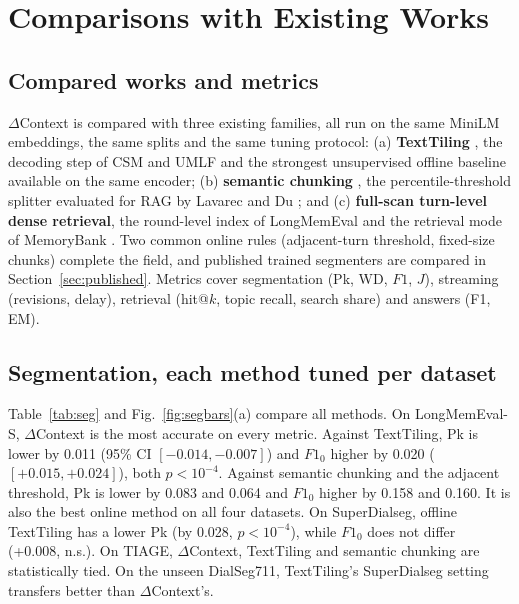 \documentclass[journal]{IEEEtran}
\newcommand{\dc}{$\Delta$Context}
\begin{document}
\section{Comparisons with Existing Works}
\label{sec:comp}

\subsection{Compared works and metrics}
\dc{} is compared with three existing families, all run on the same MiniLM
embeddings, the same splits and the same tuning protocol:
(a) \textbf{TextTiling} \cite{hearst1997texttiling}, the decoding step of CSM
and UMLF \cite{xing2021csm,xu2025umlf} and the strongest unsupervised offline
baseline available on the same encoder;
(b) \textbf{semantic chunking} \cite{langchain2024semantic}, the
percentile-threshold splitter evaluated for RAG by Lavarec and Du
\cite{lavarec2026chunking}; and (c) \textbf{full-scan turn-level dense
retrieval}, the round-level index of LongMemEval \cite{wu2025longmemeval} and
the retrieval mode of MemoryBank \cite{zhong2024memorybank}. Two common online
rules (adjacent-turn threshold, fixed-size chunks) complete the field, and
published trained segmenters are compared in Section~\ref{sec:published}.
Metrics cover segmentation (Pk, WD, $F1$, $J$), streaming (revisions, delay),
retrieval (hit@$k$, topic recall, search share) and answers (F1, EM).

\subsection{Segmentation, each method tuned per dataset}
Table~\ref{tab:seg} and Fig.~\ref{fig:segbars}(a) compare all methods.
On LongMemEval-S, \dc{} is the most accurate on every metric. Against
TextTiling, Pk is lower by 0.011 (95\% CI $[-0.014,-0.007]$) and $F1_0$ higher
by 0.020 ($[+0.015,+0.024]$), both $p<10^{-4}$. Against semantic chunking and
the adjacent threshold, Pk is lower by 0.083 and 0.064 and $F1_0$ higher by
0.158 and 0.160. It is also the best online method on all four datasets. On
SuperDialseg, offline TextTiling has a lower Pk (by 0.028, $p<10^{-4}$), while
$F1_0$ does not differ (+0.008, n.s.). On TIAGE, \dc{}, TextTiling and
semantic chunking are statistically tied. On the unseen DialSeg711,
TextTiling's SuperDialseg setting transfers better than \dc{}'s.
\end{document}

